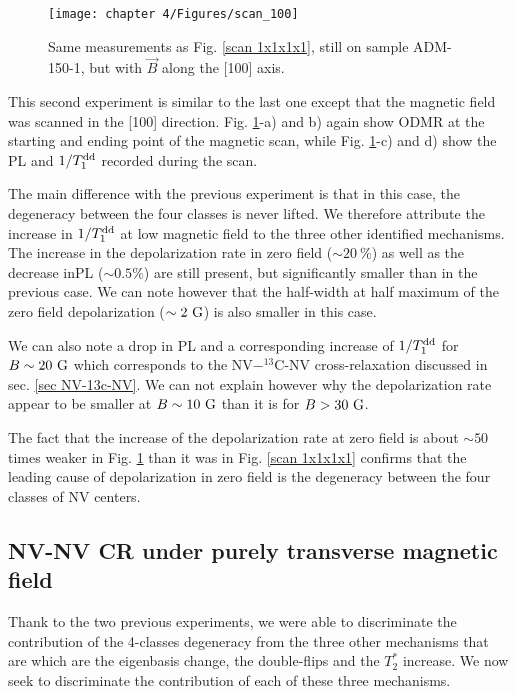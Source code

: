 \documentclass[a4paper, 11pt]{report}
\begin{document}
\begin{figure}[h]
\centering
\texttt{[image: chapter 4/Figures/scan\_100]}
\caption{Same measurements as Fig. \ref{scan 1x1x1x1}, still on sample ADM-150-1, but with $\vec{B}$ along the [100] axis.}
\label{scan 100}
\end{figure}

This second experiment is similar to the last one except that the magnetic field was scanned in the [100] direction. Fig. \ref{scan 100}-a) and b) again show ODMR at the starting and ending point of the magnetic scan, while Fig. \ref{scan 100}-c) and d) show the PL and $1/T_1^{\rm dd}$ recorded during the scan.

The main difference with the previous experiment is that in this case, the degeneracy between the four classes is never lifted. We therefore attribute the increase in $1/T_1^{\rm dd}$ at low magnetic field to the three other identified mechanisms. The increase in the depolarization rate in zero field ($\sim 20\ \%$) as well as the decrease inPL ($\sim 0.5 \%$) are still present, but significantly smaller than in the previous case. We can note however that the half-width at half maximum of the zero field depolarization ($\sim 2\ \rm G$) is also smaller in this case.

We can also note a drop in PL and a corresponding increase of $1/T_1^{\rm dd}$ for $B \sim 20\ \rm G$ which corresponds to the NV$-^{13}$C-NV cross-relaxation discussed in sec. \ref{sec NV-13c-NV}. We can not explain however why the depolarization rate appear to be smaller at $B \sim 10\ \rm G$ than it is for $B > 30\ \rm G$.

The fact that the increase of the depolarization rate at zero field is about $\sim 50$ times weaker in Fig. \ref{scan 100} than it was in Fig. \ref{scan 1x1x1x1} confirms that the leading cause of depolarization in zero field is the degeneracy between the four classes of NV centers. 

\subsection{NV-NV CR under purely transverse magnetic field}

Thank to the two previous experiments, we were able to discriminate the contribution of the 4-classes degeneracy from the three other mechanisms that are which are the eigenbasis change, the double-flips and the $T_2^*$ increase. We now seek to discriminate the contribution of each of these three mechanisms.
\end{document}
